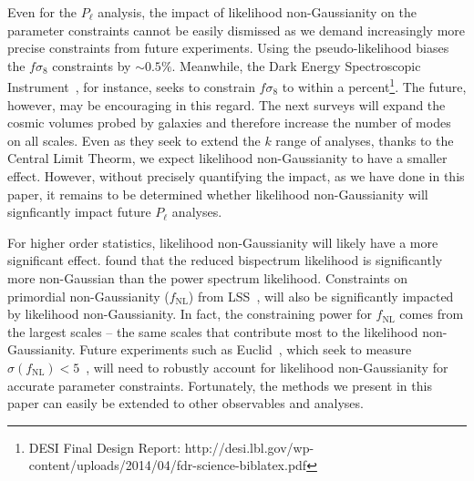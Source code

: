 \documentclass[12pt, letterpaper, preprint]{aastex}
\let\oldmarginpar\marginpar
\renewcommand\marginpar[1]{\-\oldmarginpar[\raggedleft\footnotesize #1]%
  {\raggedright\footnotesize #1}}
\newcommand{\todo}[1]{\marginpar{\color{red}TODO}{\color{red}#1}}
\newcommand{\lss}{{\small{LSS}}\xspace}
\begin{document}
Even for the $P_\ell$ analysis, the impact of likelihood non-Gaussianity 
on the parameter constraints cannot be easily dismissed as we demand 
increasingly more precise constraints from future experiments. Using the 
pseudo-likelihood biases the $f\sigma_8$ constraints by $\sim 0.5\%$. 
Meanwhile, the Dark Energy Spectroscopic Instrument~\citep[DESI;][]{levi2013}, 
for instance, seeks to constrain $f\sigma_8$ to within a 
percent\footnote{DESI Final Design Report: http://desi.lbl.gov/wp-content/uploads/2014/04/fdr-science-biblatex.pdf}. 
The future, however, may be encouraging in this regard. The next surveys 
will expand the cosmic volumes probed by galaxies and therefore increase 
the number of modes on all scales. Even as they seek to extend the $k$ 
range of analyses, thanks to the Central Limit Theorm, we expect 
likelihood non-Gaussianity to have a smaller effect. However, without 
precisely quantifying the impact, as we have done in this paper, it 
remains to be determined whether likelihood non-Gaussianity will signficantly 
impact future $P_\ell$ analyses.  

For higher order statistics, likelihood non-Gaussianity will likely 
have a more significant effect. \cite{scoccimarro2000}   
found that the reduced bispectrum likelihood is significantly more 
non-Gaussian than the power spectrum likelihood. Constraints on primordial 
non-Gaussianity ($f_\mathrm{NL}$) from \lss~\citep[\emph{e.g.}][]{dalal2008, slosar2008, ross2013, giannantonio2014}, 
will also be significantly impacted by likelihood non-Gaussianity. 
In fact, the constraining power for $f_\mathrm{NL}$ comes from the 
largest scales -- the same scales that contribute most to the likelihood non-Gaussianity. 
Future experiments such as Euclid~\citep{amendola2016}, which seek 
to measure $\sigma(f_\mathrm{NL}) < 5$~\citep{giannantonio2012, amendola2016}, 
will need to robustly account for likelihood non-Gaussianity for 
accurate parameter constraints. Fortunately, the methods we present 
in this paper can easily be extended to other observables and analyses. 

\end{document}
